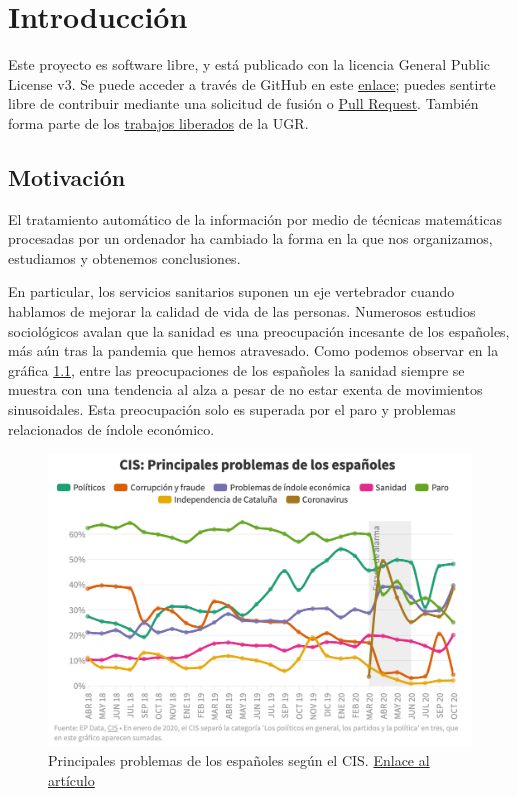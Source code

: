\chapter{Introducción}
Este proyecto es software libre, y está publicado con la licencia \cite{gplv3} General
Public License v3. Se puede acceder a través de GitHub en este
\href{https://github.com/pablojjimenez/TFG}{enlace}; puedes sentirte libre de contribuir
mediante una solicitud de fusión o \href{https://github.com/pablojjimenez/TFG/pulls}{Pull
Request}. También forma parte de los \href{https://github.com/JJ/TF-libres-UGR}{trabajos
liberados} de la UGR.

\section{Motivación} 
El tratamiento automático de la información por medio de técnicas matemáticas procesadas
por un ordenador ha cambiado la forma en la que nos organizamos, estudiamos y obtenemos
conclusiones.

En particular, los servicios sanitarios suponen un eje vertebrador cuando hablamos de
mejorar la calidad de vida de las personas. Numerosos estudios sociológicos avalan que la
sanidad es una preocupación incesante de los españoles, más aún tras la pandemia
que hemos atravesado. Como podemos observar en la gráfica \ref{fig:problemascis}, entre
las preocupaciones de los españoles la sanidad siempre se muestra con una tendencia al
alza a pesar de no estar exenta de movimientos sinusoidales. Esta preocupación solo es
superada por el paro y problemas relacionados de índole económico.

\FloatBarrier
\begin{figure}[h]
	\centering	
	\includegraphics[width=\textwidth]{doc/logos/imgs/CIS_1.png}
	\caption{ Principales problemas de los españoles según el CIS.
        \href{https://www.rtve.es/noticias/20201015/crisis-economica-coronavirus-preocupan-ahora-mas-espanoles-paro/2045610.shtml}{Enlace
        al artículo} }
    \label{fig:problemascis}
\end{figure}
\FloatBarrier

